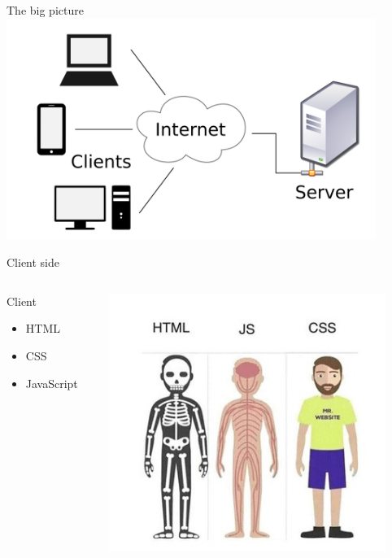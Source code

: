 \documentclass{beamer}
\begin{document}
\begin{frame}{The big picture}
	\centering
	\includegraphics[width=0.9\textwidth]{client-server.png}
\end{frame}

\begin{frame}{Client side}
	\begin{columns}
		\begin{column}{0.5\textwidth}
			Client
			\begin{itemize}
				\item HTML
				\item CSS
				\item JavaScript
			\end{itemize}
		\end{column}
		\pause
		\begin{column}{0.5\textwidth}
			\includegraphics[width=0.9\textwidth]{web-tech.jpeg}
		\end{column}
	\end{columns}
\end{frame}
\end{document}
